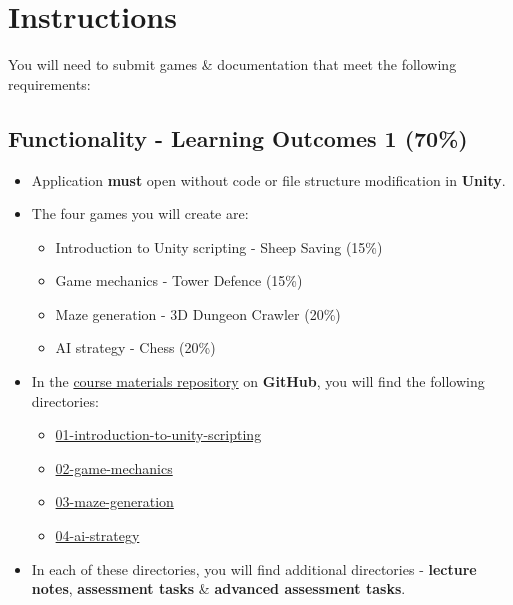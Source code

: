 \documentclass{article}
\begin{document}
\section*{Instructions}
You will need to submit games \& documentation that meet the following requirements:

\subsection*{Functionality - Learning Outcomes 1 (70\%)}
\begin{itemize}
	\item Application \textbf{must} open without code or file structure modification in \textbf{Unity}.
	\item The four games you will create are:
	\begin{itemize}
		\item Introduction to Unity scripting - Sheep Saving (15\%)
		\item Game mechanics - Tower Defence (15\%)
		\item Maze generation - 3D Dungeon Crawler (20\%)
		\item AI strategy - Chess (20\%)
	\end{itemize}
	\item In the \href{https://github.com/otago-polytechnic-bit-courses/ID630151-introduction-to-algorithmic-problem-solving}{course materials repository} on \textbf{GitHub}, you will find the following directories:
	\begin{itemize}
		\item \href{https://github.com/otago-polytechnic-bit-courses/ID630151-introduction-to-algorithmic-problem-solving/tree/main/01-introduction-to-unity-scripting}{01-introduction-to-unity-scripting}
		\item \href{https://github.com/otago-polytechnic-bit-courses/ID630151-introduction-to-algorithmic-problem-solving/tree/main/02-game-mechanics}{02-game-mechanics}
		\item \href{https://github.com/otago-polytechnic-bit-courses/ID630151-introduction-to-algorithmic-problem-solving/tree/main/03-maze-generation}{03-maze-generation}
		\item \href{https://github.com/otago-polytechnic-bit-courses/ID630151-introduction-to-algorithmic-problem-solving/tree/main/04-ai-strategy}{04-ai-strategy}
	\end{itemize}
	\item In each of these directories, you will find additional directories - \textbf{lecture notes}, \textbf{assessment tasks} \& \textbf{advanced assessment tasks}. 

\end{itemize}
\end{document}
